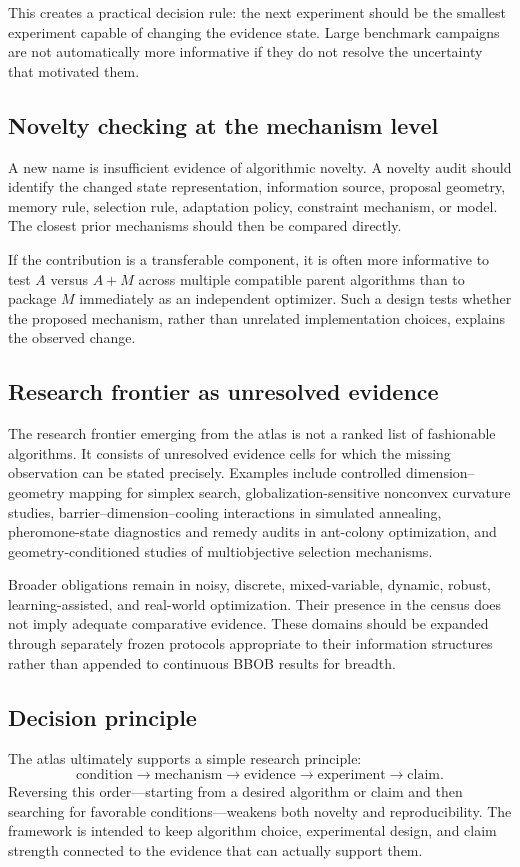 This creates a practical decision rule: the next experiment should be the smallest experiment capable of changing the evidence state. Large benchmark campaigns are not automatically more informative if they do not resolve the uncertainty that motivated them.

\subsection{Novelty checking at the mechanism level}

A new name is insufficient evidence of algorithmic novelty. A novelty audit should identify the changed state representation, information source, proposal geometry, memory rule, selection rule, adaptation policy, constraint mechanism, or model. The closest prior mechanisms should then be compared directly.

If the contribution is a transferable component, it is often more informative to test \(A\) versus \(A+M\) across multiple compatible parent algorithms than to package \(M\) immediately as an independent optimizer. Such a design tests whether the proposed mechanism, rather than unrelated implementation choices, explains the observed change.

\subsection{Research frontier as unresolved evidence}

The research frontier emerging from the atlas is not a ranked list of fashionable algorithms. It consists of unresolved evidence cells for which the missing observation can be stated precisely. Examples include controlled dimension--geometry mapping for simplex search, globalization-sensitive nonconvex curvature studies, barrier--dimension--cooling interactions in simulated annealing, pheromone-state diagnostics and remedy audits in ant-colony optimization, and geometry-conditioned studies of multiobjective selection mechanisms.

Broader obligations remain in noisy, discrete, mixed-variable, dynamic, robust, learning-assisted, and real-world optimization. Their presence in the census does not imply adequate comparative evidence. These domains should be expanded through separately frozen protocols appropriate to their information structures rather than appended to continuous BBOB results for breadth.

\subsection{Decision principle}

The atlas ultimately supports a simple research principle:
\begin{equation}
\text{condition}\rightarrow\text{mechanism}\rightarrow\text{evidence}\rightarrow\text{experiment}\rightarrow\text{claim}.
\end{equation}
Reversing this order---starting from a desired algorithm or claim and then searching for favorable conditions---weakens both novelty and reproducibility. The framework is intended to keep algorithm choice, experimental design, and claim strength connected to the evidence that can actually support them.
